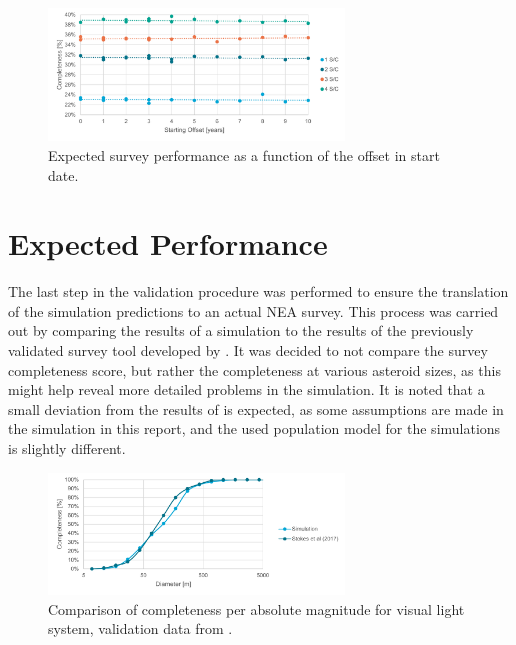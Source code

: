 \begin{figure}[htbp]
 \centering
 \includegraphics[width=0.7\textwidth]{img/validation_starting_year.pdf}
 \caption{Expected survey performance as a function of the offset in start date.}
 \label{fig:validation_starting_year}
\end{figure}



\section{Expected Performance}
\label{sec:vvperformance}

The last step in the validation procedure was performed to ensure the translation of the simulation predictions to an actual NEA survey. This process was carried out by comparing the results of a simulation to the results of the previously validated survey tool developed by \cite{2017NEOSDT}. It was decided to not compare the survey completeness score, but rather the completeness at various asteroid sizes, as this might help reveal more detailed problems in the simulation. It is noted that a small deviation from the results of \cite{2017NEOSDT} is expected, as some assumptions are made in the simulation in this report, and the used population model for the simulations is slightly different.

\begin{figure}[htbp]
 \centering
 \includegraphics[width=0.7\textwidth]{img/validation_completeness_vis.pdf}
 \caption{Comparison of completeness per absolute magnitude for visual light system, validation data from \cite{2017NEOSDT}.}
 \label{fig:validation_completeness_vis}
\end{figure}


